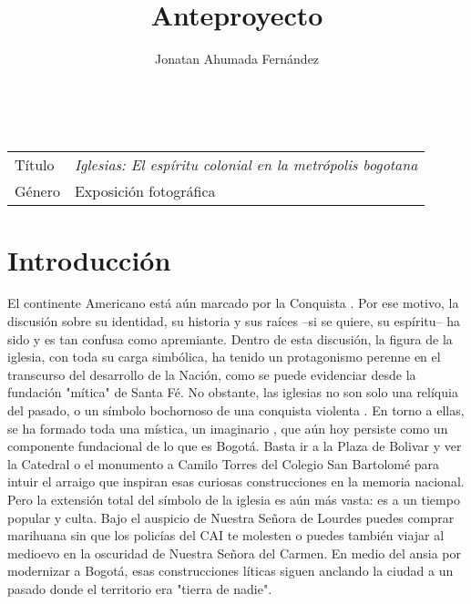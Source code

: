 \documentclass[11pt]{article}
\author{Jonatan Ahumada Fernández}
\title{Anteproyecto}
\renewcommand{\maketitle}{
\begin{center}

\huge\thetitle \\
\Large\theauthor
\end{center}
}
\begin{document}
\maketitle
\begin{center}
\begin{tabular}{ll}
Título & \emph{Iglesias: El espíritu colonial en la metrópolis bogotana}\\
Género & Exposición fotográfica\\
\end{tabular}
\end{center}


\section{Introducción}
\label{sec-1}
El continente Americano está aún marcado por la Conquista \cite{video}. Por ese motivo,
la discusión sobre su identidad, su historia y sus raíces --si se quiere, su espíritu-- ha sido y es 
tan confusa como apremiante. Dentro de esta discusión, la figura de la iglesia, con toda su carga simbólica, ha tenido un 
protagonismo perenne en el transcurso del desarrollo de la Nación, como se puede evidenciar 
desde la fundación "mítica" de Santa Fé. No obstante, las iglesias no son solo una relíquia del 
pasado, o un símbolo bochornoso de una conquista violenta \cite{tovar1968arte}. En torno a ellas, se ha formado 
toda una mística, un imaginario \cite{silva2006imaginarios}, que aún hoy persiste como un componente fundacional de lo que es 
Bogotá. Basta ir a la Plaza de Bolivar y ver la Catedral o el monumento a Camilo Torres del Colegio
San Bartolomé para intuir el arraigo que inspiran esas curiosas construcciones en la memoria nacional. Pero la extensión 
total del símbolo de la iglesia es aún más vasta: es a un tiempo popular y culta. Bajo el auspicio 
de Nuestra Señora de Lourdes puedes comprar marihuana sin que los policías del CAI te molesten o 
puedes también viajar al medioevo en la oscuridad de Nuestra Señora del Carmen. En medio
del ansia por modernizar a Bogotá, esas construcciones líticas siguen anclando la ciudad a un pasado
donde el territorio era "tierra de nadie". 
\end{document}
